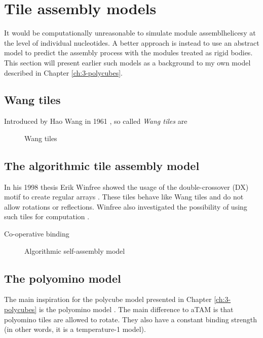 \section{Tile assembly models}
It would be computationally unreasonable to simulate module assemblhelicesy at the level of individual nucleotides. A better approach is instead to use an abstract model to predict the assembly process with the modules treated as rigid bodies. This section will present earlier such models as a background to my own model described in Chapter \ref{ch:3-polycubes}.

\subsection{Wang tiles}
Introduced by Hao Wang in 1961 \cite{wang1961proving}, so called \emph{Wang tiles} are 

\begin{figure}[h]
  \centering
  \caption{Wang tiles}
\end{figure}

\subsection{The algorithmic tile assembly model}


In his 1998 thesis Erik Winfree showed the usage of the double-crossover (DX) motif to create regular arrays \cite{winfree1998design}. These tiles behave like Wang tiles\cite{wang1961proving} and do not allow rotations or reflections. Winfree also investigated the possibility of using such tiles for computation \cite{winfree1998algorithmic}.

Co-operative binding

\begin{figure}[h]
  \centering
  \caption{Algorithmic self-assembly model}
\end{figure}

\subsection{The polyomino model}\label{sec:polyomino}

The main inspiration for the polycube model presented in Chapter \ref{ch:3-polycubes} is the polyomino model \cite{ahnert2010self}\cite{johnston2011evolutionary}. The main difference to aTAM is that polyomino tiles are allowed to rotate. They also have a constant binding strength (in other words, it is a temperature-1 model).

